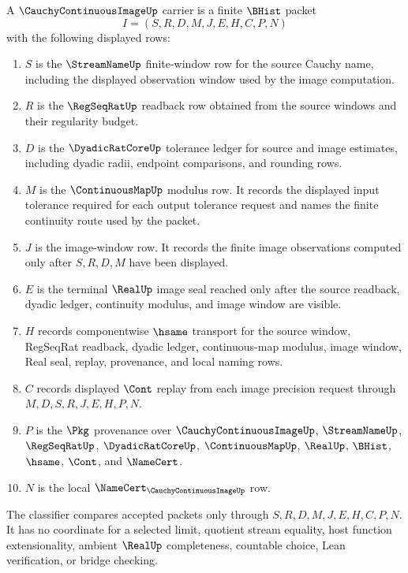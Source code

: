 \begin{definition}
\label{def:cauchy-continuous-image-carrier}
A $\CauchyContinuousImageUp$ carrier is a finite $\BHist$ packet
$$
I=(S,R,D,M,J,E,H,C,P,N)
$$
with the following displayed rows:
\begin{enumerate}
\item $S$ is the $\StreamNameUp$ finite-window row for the source Cauchy name, including the displayed observation window used by the image computation.
\item $R$ is the $\RegSeqRatUp$ readback row obtained from the source windows and their regularity budget.
\item $D$ is the $\DyadicRatCoreUp$ tolerance ledger for source and image estimates, including dyadic radii, endpoint comparisons, and rounding rows.
\item $M$ is the $\ContinuousMapUp$ modulus row. It records the displayed input tolerance required for each output tolerance request and names the finite continuity route used by the packet.
\item $J$ is the image-window row. It records the finite image observations computed only after $S,R,D,M$ have been displayed.
\item $E$ is the terminal $\RealUp$ image seal reached only after the source readback, dyadic ledger, continuity modulus, and image window are visible.
\item $H$ records componentwise $\hsame$ transport for the source window, RegSeqRat readback, dyadic ledger, continuous-map modulus, image window, Real seal, replay, provenance, and local naming rows.
\item $C$ records displayed $\Cont$ replay from each image precision request through $M,D,S,R,J,E,H,P,N$.
\item $P$ is the $\Pkg$ provenance over $\CauchyContinuousImageUp$, $\StreamNameUp$, $\RegSeqRatUp$, $\DyadicRatCoreUp$, $\ContinuousMapUp$, $\RealUp$, $\BHist$, $\hsame$, $\Cont$, and $\NameCert$.
\item $N$ is the local $\NameCert_{\CauchyContinuousImageUp}$ row.
\end{enumerate}
The classifier compares accepted packets only through $S,R,D,M,J,E,H,C,P,N$. It has no coordinate for a selected limit, quotient stream equality, host function extensionality, ambient $\RealUp$ completeness, countable choice, Lean verification, or bridge checking.
\end{definition}

